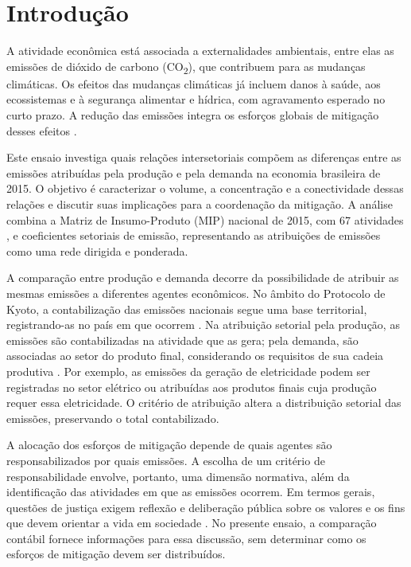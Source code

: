 \section{Introdução}

A atividade econômica está associada a externalidades ambientais, entre elas as emissões de dióxido de carbono (CO\textsubscript{2}), que contribuem para as mudanças climáticas. Os efeitos das mudanças climáticas já incluem danos à saúde, aos ecossistemas e à segurança alimentar e hídrica, com agravamento esperado no curto prazo. A redução das emissões integra os esforços globais de mitigação desses efeitos \parencite{ipcc2023spm}.

Este ensaio investiga quais relações intersetoriais compõem as diferenças entre as emissões atribuídas pela produção e pela demanda na economia brasileira de 2015. O objetivo é caracterizar o volume, a concentração e a conectividade dessas relações e discutir suas implicações para a coordenação da mitigação. A análise combina a Matriz de Insumo-Produto (MIP) nacional de 2015, com 67 atividades \parencite{ibge2015mip}, e coeficientes setoriais de emissão, representando as atribuições de emissões como uma rede dirigida e ponderada.

A comparação entre produção e demanda decorre da possibilidade de atribuir as mesmas emissões a diferentes agentes econômicos. No âmbito do Protocolo de Kyoto, a contabilização das emissões nacionais segue uma base territorial, registrando-as no país em que ocorrem \parencite{unfccc2008kyotoManual}. Na atribuição setorial pela produção, as emissões são contabilizadas na atividade que as gera; pela demanda, são associadas ao setor do produto final, considerando os requisitos de sua cadeia produtiva \parencite{marques2012,millerBlair2009}. Por exemplo, as emissões da geração de eletricidade podem ser registradas no setor elétrico ou atribuídas aos produtos finais cuja produção requer essa eletricidade. O critério de atribuição altera a distribuição setorial das emissões, preservando o total contabilizado.

A alocação dos esforços de mitigação depende de quais agentes são responsabilizados por quais emissões. A escolha de um critério de responsabilidade envolve, portanto, uma dimensão normativa, além da identificação das atividades em que as emissões ocorrem. Em termos gerais, questões de justiça exigem reflexão e deliberação pública sobre os valores e os fins que devem orientar a vida em sociedade \parencite{sandel2015justica}. No presente ensaio, a comparação contábil fornece informações para essa discussão, sem determinar como os esforços de mitigação devem ser distribuídos.

